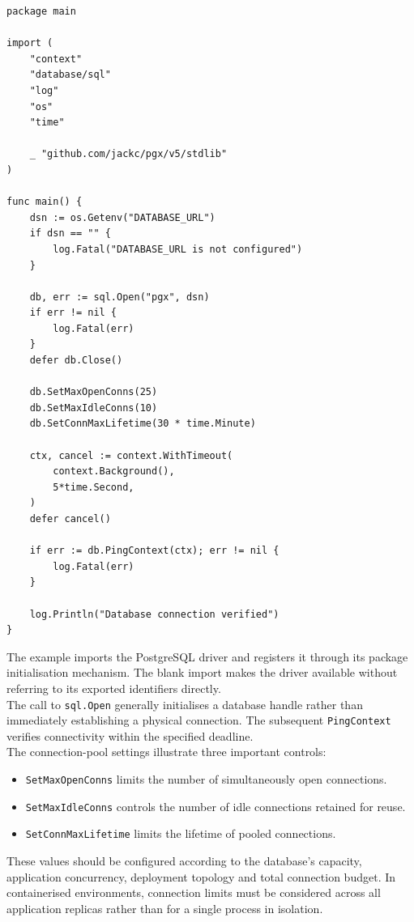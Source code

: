 \begin{lstlisting}
package main

import (
    "context"
    "database/sql"
    "log"
    "os"
    "time"

    _ "github.com/jackc/pgx/v5/stdlib"
)

func main() {
    dsn := os.Getenv("DATABASE_URL")
    if dsn == "" {
        log.Fatal("DATABASE_URL is not configured")
    }

    db, err := sql.Open("pgx", dsn)
    if err != nil {
        log.Fatal(err)
    }
    defer db.Close()

    db.SetMaxOpenConns(25)
    db.SetMaxIdleConns(10)
    db.SetConnMaxLifetime(30 * time.Minute)

    ctx, cancel := context.WithTimeout(
        context.Background(),
        5*time.Second,
    )
    defer cancel()

    if err := db.PingContext(ctx); err != nil {
        log.Fatal(err)
    }

    log.Println("Database connection verified")
}
\end{lstlisting}

The example imports the PostgreSQL driver and registers it through its package initialisation mechanism. The blank import makes the driver available without referring to its exported identifiers directly.\\

The call to \texttt{sql.Open} generally initialises a database handle rather than immediately establishing a physical connection. The subsequent \texttt{PingContext} verifies connectivity within the specified deadline.\\

The connection-pool settings illustrate three important controls:

\begin{itemize}
    \item \texttt{SetMaxOpenConns} limits the number of simultaneously open connections.
    \item \texttt{SetMaxIdleConns} controls the number of idle connections retained for reuse.
    \item \texttt{SetConnMaxLifetime} limits the lifetime of pooled connections.
\end{itemize}

These values should be configured according to the database's capacity, application concurrency, deployment topology and total connection budget. In containerised environments, connection limits must be considered across all application replicas rather than for a single process in isolation.

